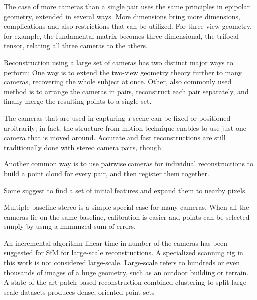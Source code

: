The case of more cameras than a single pair uses the same principles in epipolar geometry, extended in several ways.
More dimensions bring more dimensions, complications and also restrictions that can be utilized.
For three-view geometry, for example, the fundamental matrix becomes three-dimensional, the trifocal tensor, relating all three cameras to the others. \cite{hartley03multiview}

Reconstruction using a large set of cameras has two distinct major ways to perform:
One way is to extend the two-view geometry theory further to many cameras, recovering the whole subject at once.
Other, also commonly used method is to arrange the cameras in pairs, reconstruct each pair separately, and finally merge the resulting points to a single set.



The cameras that are used in capturing a scene can be fixed or positioned arbitrarily; in fact, the structure from motion technique enables to use just one camera that is moved around.
Accurate and fast reconstructions are still traditionally done with stereo camera pairs, though.

Another common way is to use pairwise cameras for individual reconstructions to build a point cloud for every pair, and then register them together. \cite{bradley2010high}

Some suggest to find a set of initial features and expand them to nearby pixels. %

Multiple baseline stereo is a simple special case for many cameras. When all the cameras lie on the same baseline, calibration is easier and points can be selected simply by using a minimized sum of errors. \cite{okutomi1993multiple}

An incremental algorithm linear-time in number of the cameras has been suggested for SfM for large-scale reconstructions. \cite{wu2013towards}
A specialized scanning rig in this work is not considered large-scale.
Large-scale refers to hundreds or even thousands of images of a huge geometry, such as an outdoor building or terrain.
A state-of-the-art patch-based reconstruction combined clustering to split large-scale datasets produces dense, oriented point sets \cite{furukawa2012patch,furukawa2010accurate}

